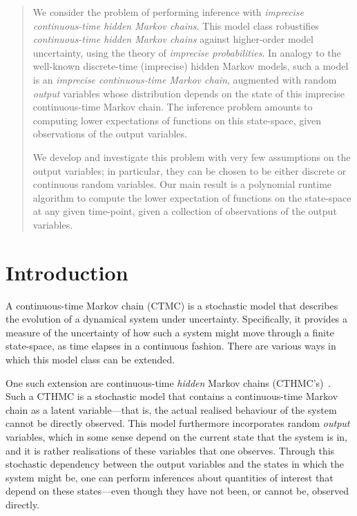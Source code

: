 \documentclass[twoside,11pt]{article}
\begin{document}
\begin{abstract}
We consider the problem of performing inference with \emph{imprecise continuous-time hidden Markov chains}. This model class robustifies \emph{continuous-time hidden Markov chains} against higher-order model uncertainty, using the theory of \emph{imprecise probabilities}. In analogy to the well-known discrete-time (imprecise) hidden Markov models, 
such a model is an \emph{imprecise continuous-time Markov chain}, augmented with random \emph{output} variables whose distribution depends on the state of this imprecise continuous-time Markov chain. The inference problem amounts to computing lower expectations of functions on this state-space, given observations of the output variables.%

We develop and investigate this problem with very few assumptions on the output variables; in particular, they can be chosen to be either discrete or continuous random variables. Our main result is a polynomial runtime algorithm to compute the lower expectation of functions on the state-space at any given time-point, given a collection of observations of the output variables.\vspace{-3pt}
\end{abstract}

\section{Introduction}\label{sec:introduction}%

A continuous-time Markov chain (CTMC) is a stochastic model that describes the evolution of a dynamical system under uncertainty. Specifically, it provides a measure of the uncertainty of how such a system might move through a finite state-space, as time elapses in a continuous fashion. There are various ways in which this model class can be extended.

One such extension are continuous-time \emph{hidden} Markov chains (CTHMC's)~\citep{wei2002continuous}. Such a CTHMC is a stochastic model that contains a continuous-time Markov chain as a latent variable---that is, the actual realised behaviour of the system cannot be directly observed. This model furthermore incorporates random \emph{output} variables, which in some sense depend on the current state that the system is in, and it is rather realisations of these variables that one observes. Through this stochastic dependency between the output variables and the states in which the system might be, one can perform inferences about quantities of interest that depend on these states---even though they have not been, or cannot be, observed directly.
\end{document}
